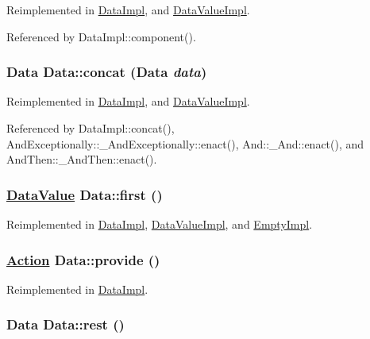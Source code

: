 Reimplemented in \hyperlink{classDataImpl_a4}{Data\-Impl}, and \hyperlink{classDataValueImpl_a4}{Data\-Value\-Impl}.

Referenced by Data\-Impl::component().

\hypertarget{interfaceData_a0}{
\subsubsection[concat]{\setlength{\rightskip}{0pt plus 5cm}Data Data::concat (Data {\em data})}}
\label{interfaceData_a0}




Reimplemented in \hyperlink{classDataImpl_a0}{Data\-Impl}, and \hyperlink{classDataValueImpl_a3}{Data\-Value\-Impl}.

Referenced by Data\-Impl::concat(), And\-Exceptionally::\_\-And\-Exceptionally::enact(), And::\_\-And::enact(), and And\-Then::\_\-And\-Then::enact().

\hypertarget{interfaceData_a2}{
\subsubsection[first]{\setlength{\rightskip}{0pt plus 5cm}\hyperlink{interfaceDataValue}{Data\-Value} Data::first ()}}
\label{interfaceData_a2}




Reimplemented in \hyperlink{classDataImpl_a2}{Data\-Impl}, \hyperlink{classDataValueImpl_a0}{Data\-Value\-Impl}, and \hyperlink{classEmptyImpl_a0}{Empty\-Impl}.\hypertarget{interfaceData_a5}{
\subsubsection[provide]{\setlength{\rightskip}{0pt plus 5cm}\hyperlink{interfaceAction}{Action} Data::provide ()}}
\label{interfaceData_a5}




Reimplemented in \hyperlink{classDataImpl_a5}{Data\-Impl}.\hypertarget{interfaceData_a3}{
\subsubsection[rest]{\setlength{\rightskip}{0pt plus 5cm}Data Data::rest ()}}
\label{interfaceData_a3}




